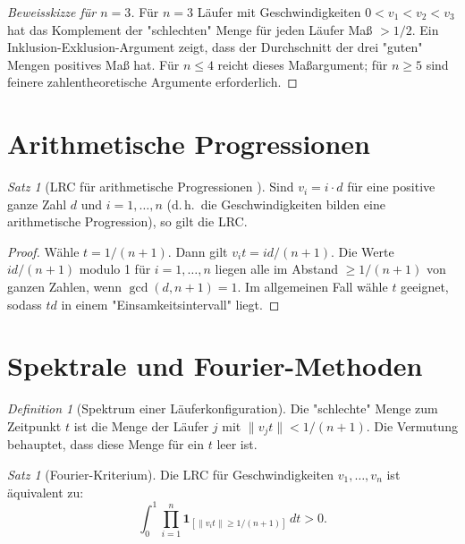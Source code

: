 \documentclass[12pt,a4paper]{amsart}
\theoremstyle{definition}
\theoremstyle{remark}
\newtheorem{satz}[theorem]{Satz}
\newtheorem{definition_de}[theorem]{Definition}
\begin{document}
\begin{proof}[Beweisskizze für $n = 3$]
Für $n = 3$ Läufer mit Geschwindigkeiten $0 < v_1 < v_2 < v_3$ hat das Komplement
der "schlechten" Menge für jeden Läufer Maß $> 1/2$. Ein Inklusion-Exklusion-Argument
zeigt, dass der Durchschnitt der drei "guten" Mengen positives Maß hat. Für $n \leq 4$
reicht dieses Maßargument; für $n \geq 5$ sind feinere zahlentheoretische Argumente
erforderlich.
\end{proof}

\section{Arithmetische Progressionen}\label{sec:ap}

\begin{satz}[LRC für arithmetische Progressionen \cite{BieniaEtal1998}]\label{satz:lrc_ap}
Sind $v_i = i \cdot d$ für eine positive ganze Zahl $d$ und $i = 1, \ldots, n$
(d.\,h.\ die Geschwindigkeiten bilden eine arithmetische Progression), so gilt die LRC.
\end{satz}

\begin{proof}
Wähle $t = 1/(n+1)$. Dann gilt $v_i t = id/(n+1)$. Die Werte $id/(n+1)$ modulo 1
für $i = 1, \ldots, n$ liegen alle im Abstand $\geq 1/(n+1)$ von ganzen Zahlen,
wenn $\gcd(d, n+1) = 1$. Im allgemeinen Fall wähle $t$ geeignet, sodass
$td$ in einem "Einsamkeitsintervall" liegt.
\end{proof}

\section{Spektrale und Fourier-Methoden}\label{sec:spektral}

\begin{definition_de}[Spektrum einer Läuferkonfiguration]
Die "schlechte" Menge zum Zeitpunkt $t$ ist die Menge der Läufer $j$ mit
$\|v_j t\| < 1/(n+1)$. Die Vermutung behauptet, dass diese Menge für ein $t$
leer ist.
\end{definition_de}

\begin{satz}[Fourier-Kriterium]\label{satz:fourier}
Die LRC für Geschwindigkeiten $v_1, \ldots, v_n$ ist äquivalent zu:
\[
  \int_0^1 \prod_{i=1}^{n} \mathbf{1}_{[\|v_i t\| \geq 1/(n+1)]} \, dt > 0.
\]
\end{satz}
\end{document}
